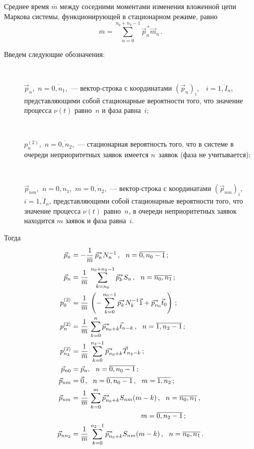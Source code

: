 \begin{multicols}{2}
Среднее время $\overline m$ между соседними моментами
изменения вложенной цепи Маркова системы, функционирующей
в стационарном режиме, равно
$$
\overline m = \sum\limits_{n=0}^{n_0+n_2-1} \vec p^{\,*}_n \vec m_n\,.
$$

Введем следующие обозначения:
\begin{description}
\item[\,] $\vec p_n$,\  $n=\overline{0,n_1}$,~---
век\-тор-стро\-ка с координатами $(\vec p_n)_i$,\ \ $i=\overline{1,I_n}$,
представляющими собой стационарные вероятности того, что
значение процесса $\nu(t)$ равно~$n$ и фаза равна~$i$;
\item[\,] 
$p^{(2)}_n$,\  $n=\overline{0,n_2}$,~---
стационарная вероятность того, что в системе в очереди
неприоритетных заявок имеется $n$~заявок (фаза не учитывается);
\item[\,] 
$\vec p_{nm}$,\  $n=\overline{0,n_1}$,\ 
$m=\overline{0,n_2}$,~---
век\-тор-стро\-ка с координатами $(\vec p_{nm})_i$,\  $i=\overline{1,I_n}$,
представляющими собой стационарные вероятности того, что
значение процесса $\nu(t)$ равно~$n$, в очереди неприоритетных
заявок находится $m$ заявок и фаза равна~$i$.
\end{description}

Тогда
\begin{align*}
 \vec p_n &= - \fr{1}{\overline m}\, \vec p^{\,*}_n N_n^{-1}\,,
\ \ n=\overline{0,n_0-1}\,;\\
\vec p_n &= \fr{1}{\overline m}\, \sum\limits_{k=n_0}^{n_0+n_2-1} \vec p^{\,*}_k S_{n}\,,
\ \ n=\overline{n_0,n_1}\,;\\
p^{(2)}_0 &= \fr{1}{\overline m}\, \left(
-
\sum\limits_{k=0}^{n_0-1} \vec p^{\,*}_k N_k^{-1} \vec 1 +
\vec p^{\,*}_{n_0} \vec t_0
\right)\,;
\\
p^{(2)}_n & = \fr{1}{\overline m}\,
\sum\limits_{k=0}^{n} \vec p^{\,*}_{n_0+k} \vec t_{n-k}\,,
\ \ n=\overline{1,n_2-1}\,;
\\
p^{(2)}_{n_2} & = \fr{1}{\overline m}\,
\sum\limits_{k=0}^{n_2-1} \vec p^{\,*}_{n_0+k} \vec T_{n_2-k}\,;
\\
\vec p_{n0} & = \vec p_n, \ \ n=\overline{0,n_0-1}\,;
\\
\vec p_{nm} & = \vec 0\,,
\ \ n=\overline{0,n_0-1}\,,
\ \ m=\overline{1,n_2}\,;
\\
\vec p_{nm} & =
\fr{1}{\overline m}\, \sum\limits_{k=0}^{m} \vec p^{\,*}_{n_0+k} S_{nm}(m-k)\,,
\ \ n=\overline{n_0,n_1}\,,\notag\\
&\hspace*{35mm} m=\overline{0,n_2-1}\,;
\\
\vec p_{nn_2} & = \fr{1}{ \overline m}\,
\sum\limits_{k=0}^{n_2-1} \vec p^{\,*}_{n_0+k} S_{nm}(m-k)\,,
\ \ n=\overline{n_0,n_1}\,.
\end{align*}


\end{multicols}
